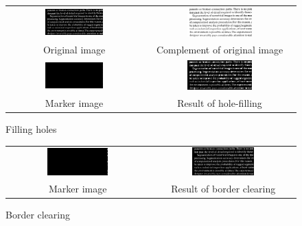 \documentclass[11pt,a4paper]{article}
\begin{document}
\begin{figure}[!htbp]
	\centering
	\begin{tabular}{cc} 
		\includegraphics[width=0.45\textwidth]{pro8/9_31_a}&
		\includegraphics[width=0.45\textwidth]{pro8/9_31_b}\\
		Original image &Complement of original image \\
		\includegraphics[width=0.45\textwidth]{pro8/9_31_c}&
		\includegraphics[width=0.45\textwidth]{pro8/9_31_d}\\
		Marker image & Result of hole-filling
	\end{tabular}
	\caption{Filling holes}
	\label{pro8_fig2}
\end{figure}

\begin{figure}[!htbp]
	\centering
	\begin{tabular}{cc} 
		\includegraphics[width=0.45\textwidth]{pro8/9_32_a}&
		\includegraphics[width=0.45\textwidth]{pro8/9_32_b}\\
		Marker image &Result of border clearing
	\end{tabular}
	\caption{Border clearing}
	\label{pro8_fig3}
\end{figure}
\end{document}
